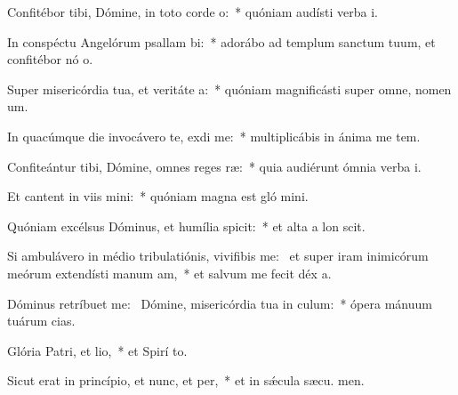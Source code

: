 \item Confitébor tibi, Dómine, in toto corde o:~* quóniam audísti verba  i.
\item In conspéctu Angelórum psallam bi:~* adorábo ad templum sanctum tuum, et confitébor nó o.
\item Super misericórdia tua, et veritáte a:~* quóniam magnificásti super omne, nomen  um.
\item In quacúmque die invocávero te, exdi me:~* multiplicábis in ánima me tem.
\item Confiteántur tibi, Dómine, omnes reges ræ:~* quia audiérunt ómnia verba  i.
\item Et cantent in viis mini:~* quóniam magna est gló mini.
\item Quóniam excélsus Dóminus, et humília spicit:~* et alta a lon scit.
\item Si ambulávero in médio tribulatiónis, vivifibis me:~\pscross{} et super iram inimicórum meórum extendísti manum am,~* et salvum me fecit déx a.
\item Dóminus retríbuet  me:~\pscross{} Dómine, misericórdia tua in culum:~* ópera mánuum tuárum  cias.
\item Glória Patri, et lio,~* et Spirí to.
\item Sicut erat in princípio, et nunc, et per,~* et in sǽcula sæcu. men.
